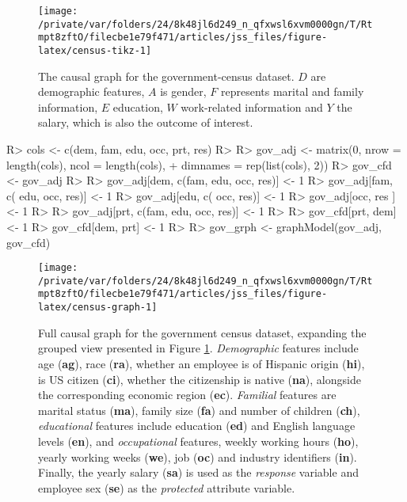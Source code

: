 \documentclass[
  nojss]{jss}
\begin{document}
\begin{CodeChunk}
\begin{figure}

{\centering \texttt{[image: /private/var/folders/24/8k48jl6d249\_n\_qfxwsl6xvm0000gn/T/Rtmpt8zftO/filecbe1e79f471/articles/jss\_files/figure-latex/census-tikz-1]} 

}

\caption[The causal graph for the government-census dataset]{The causal graph for the government-census dataset. $D$ are demographic features, $A$ is gender, $F$ represents marital and family information, $E$ education, $W$ work-related information and $Y$ the salary, which is also the outcome of interest.}\label{fig:census-tikz}
\end{figure}
\end{CodeChunk}

\begin{CodeChunk}
\begin{CodeInput}
R> cols <- c(dem, fam, edu, occ, prt, res)
R> 
R> gov_adj <- matrix(0, nrow = length(cols), ncol = length(cols),
+                   dimnames = rep(list(cols), 2))
R> gov_cfd <- gov_adj
R> 
R> gov_adj[dem, c(fam, edu, occ, res)] <- 1
R> gov_adj[fam, c(     edu, occ, res)] <- 1
R> gov_adj[edu, c(          occ, res)] <- 1
R> gov_adj[occ,                  res ] <- 1
R> 
R> gov_adj[prt, c(fam, edu, occ, res)] <- 1
R> 
R> gov_cfd[prt, dem] <- 1
R> gov_cfd[dem, prt] <- 1
R> 
R> gov_grph <- graphModel(gov_adj, gov_cfd)
\end{CodeInput}
\end{CodeChunk}

\begin{CodeChunk}
\begin{figure}

{\centering \texttt{[image: /private/var/folders/24/8k48jl6d249\_n\_qfxwsl6xvm0000gn/T/Rtmpt8zftO/filecbe1e79f471/articles/jss\_files/figure-latex/census-graph-1]} 

}

\caption{Full causal graph for the government census dataset, expanding the grouped view presented in Figure \ref{fig:census-tikz}. \textit{Demographic} features include age (\textbf{ag}), race (\textbf{ra}), whether an employee is of Hispanic origin (\textbf{hi}), is US citizen (\textbf{ci}), whether the citizenship is native (\textbf{na}), alongside the corresponding economic region (\textbf{ec}). \textit{Familial} features are marital status (\textbf{ma}), family size (\textbf{fa}) and number of children (\textbf{ch}), \textit{educational} features include education (\textbf{ed}) and English language levels (\textbf{en}), and \textit{occupational} features, weekly working hours (\textbf{ho}), yearly working weeks (\textbf{we}), job (\textbf{oc}) and industry identifiers (\textbf{in}). Finally, the yearly salary (\textbf{sa}) is used as the \textit{response} variable and employee sex (\textbf{se}) as the \textit{protected} attribute variable.}\label{fig:census-graph}
\end{figure}
\end{CodeChunk}
\end{document}
